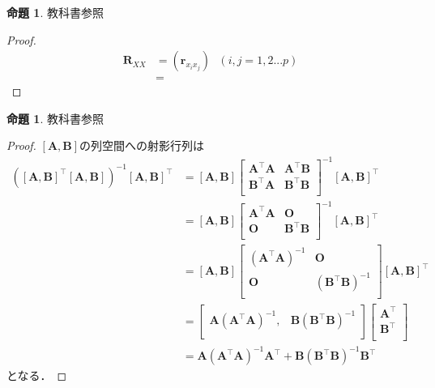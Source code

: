 \documentclass[dvipdfmx,10pt, a4j]{jarticle}
\theoremstyle{definition}
\newtheorem{proposition}[theorem]{命題}
\begin{document}
\begin{proposition}
教科書参照
\end{proposition}

\begin{proof}

\begin{align*}
  \bm{R}_{XX} &= (\bm{r}_{{x}_{i}{x}_{j}})~~~({i},{j}=1,2...p)
  \\
  &=
\end{align*}
   
\end{proof}

\begin{proposition}
  教科書参照
\end{proposition}

\begin{proof}
$[\bm{A},\bm{B}]$の列空間への射影行列は
\begin{align*}
    [\bm{A},\bm{B}]([\bm{A},\bm{B}]^{\top}[\bm{A},\bm{B}])^{-1}[\bm{A},\bm{B}]^{\top}
    &= 
    [\bm{A},\bm{B}]
    \begin{bmatrix}
        \bm{A}^{\top}\bm{A} & \bm{A}^{\top}\bm{B} \\
        \bm{B}^{\top}\bm{A} & \bm{B}^{\top}\bm{B} \\
    \end{bmatrix}^{-1}
    [\bm{A},\bm{B}]^{\top}
    \\
    &= 
    [\bm{A},\bm{B}]
    \begin{bmatrix}
        \bm{A}^{\top}\bm{A} & \bm{O} \\
        \bm{O} & \bm{B}^{\top}\bm{B} \\
    \end{bmatrix}^{-1}
    [\bm{A},\bm{B}]^{\top}
    \\
    &= 
    [\bm{A},\bm{B}]
    \begin{bmatrix}
        (\bm{A}^{\top}\bm{A})^{-1} & \bm{O} \\
        \bm{O} & (\bm{B}^{\top}\bm{B})^{-1} \\
    \end{bmatrix}
    [\bm{A},\bm{B}]^{\top}
    \\
    &= 
    \begin{bmatrix}
        \bm{A}(\bm{A}^{\top}\bm{A})^{-1} ,&
        \bm{B}(\bm{B}^{\top}\bm{B})^{-1} \\
    \end{bmatrix}
    \begin{bmatrix}
        \bm{A}^{\top} \\
        \bm{B}^{\top} \\
    \end{bmatrix}
    \\
    &= \bm{A}(\bm{A}^{\top}\bm{A})^{-1}\bm{A}^{\top} + \bm{B}(\bm{B}^{\top}\bm{B})^{-1}\bm{B}^{\top}
\end{align*}
となる．


\end{proof}
\end{document}
